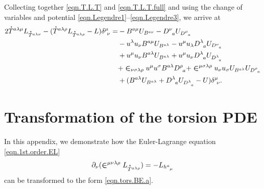 \documentclass[
10pt, %
a4paper, %
oneside, %
headinclude,footinclude, %
BCOR5mm, %
]{scrartcl}
\newcommand{\tetrsymbol}{h}
\newcommand{\tetr}[2]{\tetrsymbol^{#1}_{\phantom{#1}#2}}
\newcommand{\D}[1]{\partial_{#1}} %
\newcommand{\Dm}[2]{D_{\phantom{#2}#1}^{#2}}	%
\newcommand{\Bm}[2]{B^{#1#2}}	%
\newcommand{\Laghodge}{L}%
\newcommand{\Um}{U}%
\newcommand{\LCsymb}{\bm{\in}}    %
\newcommand{\HDT}[1]{\accentset{\star}{T}^{#1}}
\newcommand{\KD}[2]{\delta^{#1}_{\ #2}}
\newcommand{\projector}[2]{\Delta^{#1}_{\ #2}}
\begin{document}
Collecting together \eqref{eqn.T.L.T} and \eqref{eqn.T.L.T.full} and using the change of 
variables and potential \eqref{eqn.Legendre1}--\eqref{eqn.Legendre3}, we arrive at
\begin{align}\label{eqn.Sigma.tors.part}
	2 \HDT{a\lambda\mu}L_{\HDT{a\lambda\nu}} - 
	(\HDT{a\lambda\rho}L_{\HDT{a\lambda\rho}} - L) \KD{\mu}{\nu} =
	& - \Bm{a}{\mu}\Um_{\Bm{a}{\nu}} - \Dm{a}{\nu}\Um_{\Dm{a}{\mu}} \\
	& - u^\lambda u_\nu \Bm{a}{\mu} \Um_{\Bm{a}{\lambda}} - u^\mu u_\lambda \Dm{a}{\lambda} 
		\Um_{\Dm{a}{\nu}}				\nonumber\\
	& + u^\mu u_\nu \Bm{a}{\lambda} \Um_{\Bm{a}{\lambda}} 
	  + u^\mu u_\nu \Dm{a}{\lambda} \Um_{\Dm{a}{\lambda}}
	  \nonumber \\
	& + \LCsymb_{\nu\sigma\lambda\rho} u^\mu u^\sigma \Bm{a}{\lambda} \Dm{a}{\rho} 
	  + \LCsymb^{\mu\sigma\lambda\rho} u_\nu u_\sigma \Um_{\Bm{a}{\lambda}} 
	  \Um_{\Dm{a}{\rho}} 
	  \nonumber \\
	& + (\Bm{a}{\lambda} \Um_{\Bm{a}{\lambda}} + \Dm{a}{\lambda} \Um_{\Dm{a}{\lambda}} - 
	\Um) \KD{\mu}{\nu}. \nonumber
\end{align}







\section{Transformation of the torsion PDE}\label{app.sec.Deqn}


In this appendix, we demonstrate how the Euler-Lagrange equation \eqref{eqn.1st.order.EL} 
\begin{equation}\label{eqn.EL.tors}
	\D{\nu}(\LCsymb^{\mu\nu\lambda\rho}\Laghodge_{\HDT{a\lambda\rho}}) 
	=-\Laghodge_{\tetr{a}{\mu}}
\end{equation}
can be 
transformed to the form \eqref{eqn.tors.BE.a}.
\end{document}
